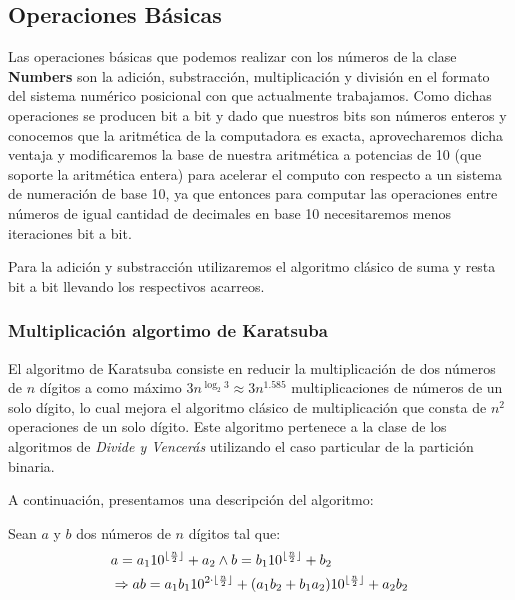 \documentclass[a4paper,10pt,twocolumn]{article}
\begin{document}
\subsection{Operaciones Básicas}\label{sub:basic operations}

Las operaciones básicas que podemos realizar con los números de la clase \textbf{Numbers} son la adición, substracción, multiplicación y división en el formato del sistema numérico posicional con que actualmente trabajamos. Como dichas operaciones se producen bit a bit y dado que nuestros bits son números enteros y conocemos que la aritmética de la computadora es exacta, aprovecharemos dicha ventaja y modificaremos la base de nuestra aritmética a potencias de 10 (que soporte la aritmética entera) para acelerar el computo con respecto a un sistema de numeración de base 10, ya que entonces para computar las operaciones entre números de igual cantidad de decimales en base 10 necesitaremos menos iteraciones bit a bit.

Para la adición y substracción utilizaremos el algoritmo clásico de suma y resta bit a bit llevando los respectivos acarreos.


\subsubsection{Multiplicación algortimo de Karatsuba}\label{sub:multiplication}
El algoritmo de Karatsuba consiste en reducir la multiplicación de dos números de $n$ dígitos a como máximo 
$3n^{\log_2 3}\approx 3n^{1.585}$ multiplicaciones de números de un solo dígito, lo cual mejora el algoritmo clásico de multiplicación que consta de $n^2$ operaciones de un solo dígito. Este algoritmo pertenece a la clase de los algoritmos de \emph{Divide y Vencerás} utilizando el caso particular de la partición binaria.

A continuación, presentamos una descripción del algoritmo:

Sean $a$ y $b$ dos números de $n$ dígitos tal que:
\begin{equation}
	\begin{split}
		&a=a_1 10^{\lfloor {n\over 2}\rfloor} + a_2 \wedge b=b_1 10^{\lfloor {n\over 2}\rfloor} + b_2	\\	
		&\Rightarrow ab=a_1 b_1 10^{2\cdot\lfloor {n\over 2}\rfloor}+(a_1 b_2+b_1 a_2 )10^{\lfloor {n\over 2}\rfloor}+a_2 b_2
	\end{split}
\end{equation}
\end{document}
